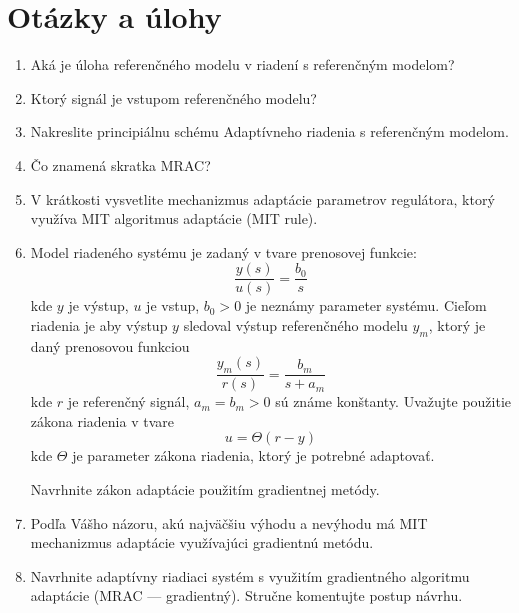 \documentclass[a4paper, 10pt, ]{article}
\begin{document}

\section{Otázky a úlohy}


\begin{enumerate}[leftmargin=0pt, labelsep=4mm, itemsep=0pt]

	\item Aká je úloha referenčného modelu v riadení s referenčným modelom?
	\item Ktorý signál je vstupom referenčného modelu?
	\item Nakreslite principiálnu schému Adaptívneho riadenia s referenčným modelom.
	\item Čo znamená skratka MRAC?

	\item V krátkosti vysvetlite mechanizmus adaptácie parametrov regulátora, ktorý využíva MIT algoritmus adaptácie (MIT rule).

	\item Model riadeného systému je zadaný v tvare prenosovej funkcie:
	\begin{equation*}
		\frac{y(s)}{u(s)} = \frac{b_0}{s}
	\end{equation*}
	kde $y$ je výstup, $u$ je vstup, $b_0 > 0$ je neznámy parameter systému. Cieľom riadenia je aby výstup $y$ sledoval výstup referenčného modelu $y_m$, ktorý je daný prenosovou funkciou
	\begin{equation*}
			\frac{y_m(s)}{r(s)} = \frac{b_m}{s + a_m}
	\end{equation*}
	kde $r$ je referenčný signál, $a_m = b_m > 0$ sú známe konštanty. Uvažujte použitie zákona riadenia v tvare
	\begin{equation*}
		u = \Theta (r - y)
	\end{equation*}
	kde $\Theta$ je parameter zákona riadenia, ktorý je potrebné adaptovať.

	Navrhnite zákon adaptácie použitím gradientnej metódy.

	\item Podľa Vášho názoru, akú najväčšiu výhodu a nevýhodu má MIT mechanizmus adaptácie využívajúci gradientnú metódu.


	\item Navrhnite adaptívny riadiaci systém s využitím gradientného algoritmu adaptácie (MRAC --- gradientný). Stručne komentujte postup návrhu.


\end{enumerate}
\end{document}
